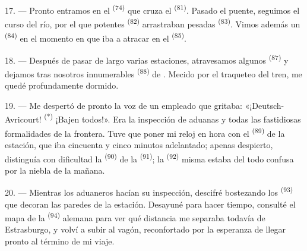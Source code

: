 17. --- Pronto entramos en el  \textsuperscript{(74)} que
cruza el  \textsuperscript{(81)}. Pasado el puente, seguimos el curso del
río, por el que potentes  \textsuperscript{(82)} arrastraban
pesadas  \textsuperscript{(83)}. Vimos además un  \textsuperscript{(84)} en el momento en que iba a atracar en el
 \textsuperscript{(85)}.

18. --- Después de pasar de largo varias estaciones, atravesamos algunos
 \textsuperscript{(87)} y dejamos tras nosotros innumerables
 \textsuperscript{(88)} de . Mecido por el
traqueteo del tren, me quedé profundamente dormido.

\VUsaut{3.0mm}
\VUsaut{3.0mm}

19. --- Me despertó de pronto la voz de un empleado que gritaba:
«¡Deutsch-Avricourt! \textsuperscript{(*)} ¡Bajen todos!». Era la inspección de
aduanas y todas las fastidiosas formalidades de la frontera. Tuve que
poner mi reloj en hora con el  \textsuperscript{(89)} de la estación,
que iba cincuenta y cinco minutos adelantado; apenas despierto,
distinguía con dificultad la  \textsuperscript{(90)} de la
 \textsuperscript{(91)}; la  \textsuperscript{(92)} misma estaba
del todo confusa por la niebla de la mañana.

20. --- Mientras los aduaneros hacían su inspección, descifré bostezando
los  \textsuperscript{(93)} que decoran las paredes de la estación.
Desayuné para hacer tiempo, consulté el mapa de la 
\textsuperscript{(94)} alemana para ver qué distancia me separaba todavía de
Estrasburgo, y volví a subir al vagón, reconfortado por la esperanza de
llegar pronto al término de mi viaje.
\VUsaut{6.0mm}
\VUfilet{22mm}
